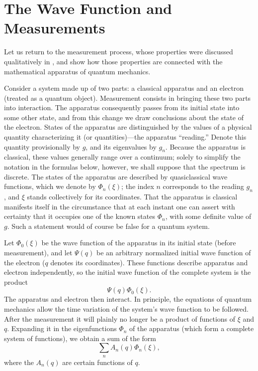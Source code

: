\section{The Wave Function and Measurements}

Let us return to the measurement process, whose properties were discussed
qualitatively in , and show how those properties are connected with the
mathematical apparatus of quantum mechanics.

Consider a system made up of two parts: a classical apparatus and an electron
(treated as a quantum object). Measurement consists in bringing these two
parts into interaction. The apparatus consequently passes from its initial
state into some other state, and from this change we draw conclusions about
the state of the electron. States of the apparatus are distinguished by the
values of a physical quantity characterizing it (or%
quantities)---the apparatus ``reading.'' Denote this quantity provisionally by
$g$, and its eigenvalues by $g_n$. Because the apparatus is classical, these
values generally range over a continuum; solely to simplify the notation in
the formulas below, however, we shall suppose that the spectrum is discrete.
The states of the apparatus are described by quasiclassical wave functions,
which we denote by $\Phi_n(\xi)$; the index $n$ corresponds to the reading
$g_n$, and $\xi$ stands collectively for its coordinates.
That the apparatus is classical manifests itself in the circumstance that at
each instant one can assert with certainty that it occupies one of the known states
$\Phi_n$, with some definite value of $g$. Such a statement would of course
be false for a quantum system.

Let $\Phi_0(\xi)$ be the wave function of the apparatus in its initial state
(before measurement), and let $\Psi(q)$ be an arbitrary normalized initial
wave function of the electron ($q$ denotes its coordinates). These functions
describe apparatus and electron independently, so the initial wave function
of the complete system is the product
\begin{equation}
  \Psi(q)\Phi_0(\xi).
  \tag{7.1}
\end{equation}
The apparatus and electron then interact. In principle, the equations of
quantum mechanics allow the time variation of the system's wave function to
be followed. After the measurement it will plainly no longer be a product of
functions of $\xi$ and $q$. Expanding it in the eigenfunctions $\Phi_n$ of the
apparatus (which form a complete system of functions), we obtain a sum of the
form
\begin{equation}
  \sum_n A_n(q)\Phi_n(\xi),
  \tag{7.2}
\end{equation}
where the $A_n(q)$ are certain functions of $q$.


